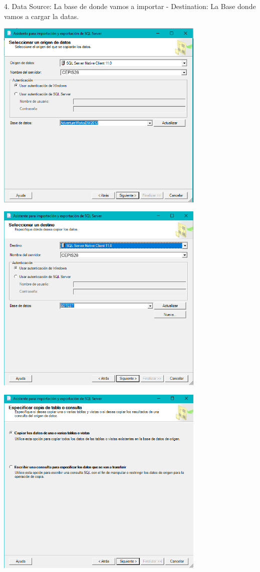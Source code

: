 4. Data Source: La base de donde vamos a importar - Destination: La Base donde vamos a cargar la datas.
	\begin{center}
	\includegraphics[width=10cm]{imagenes/img4}
    \end{center}	
    
	\begin{center}
	\includegraphics[width=10cm]{imagenes/img5}
    \end{center}	
    
	\begin{center}
	\includegraphics[width=10cm]{imagenes/img6}
    \end{center}	
    
